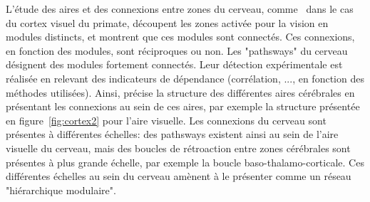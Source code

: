 L'étude des aires et des connexions entre zones du cerveau, comme~\cite{primate_cortex_91} dans le cas du cortex visuel du primate, découpent les zones activée pour la vision en modules distincts, et montrent que ces modules sont connectés. Ces connexions, en fonction des modules, sont réciproques ou non. Les "pathsways" du cerveau désignent des modules fortement connectés. Leur détection expérimentale est réalisée en relevant des indicateurs de dépendance (corrélation, ..., en fonction des méthodes utilisées). Ainsi, \cite{Rolls2002ComputationalNO} précise la structure des différentes aires cérébrales en présentant les connexions au sein de ces aires, par exemple la structure présentée en figure~\ref{fig:cortex2} pour l'aire visuelle. 
Les connexions du cerveau sont présentes à différentes échelles: des pathsways existent ainsi au sein de l'aire visuelle du cerveau, mais des boucles de rétroaction entre zones cérébrales sont présentes à plus grande échelle, par exemple la boucle baso-thalamo-corticale. Ces différentes échelles au sein du cerveau amènent \cite{Meunier2010ModularAH} à le présenter comme un réseau "hiérarchique modulaire".



%
%
% 


